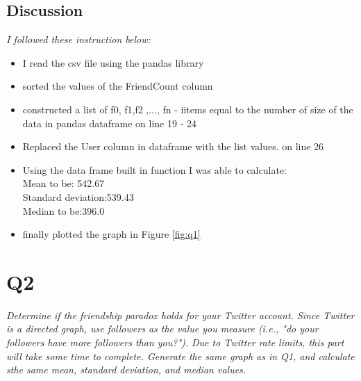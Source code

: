 \documentclass[12pt]{article}
\begin{document}
\subsection*{Discussion}
\emph{I followed these instruction below:}
    \begin{itemize}
        \item I read the csv file using the pandas library 
        \item sorted the values of the FriendCount column
        \item constructed a list of f0, f1,f2 ,..., fn - iitems equal to the number of size of the data in pandas dataframe on line 19 - 24
        \item Replaced the User column in dataframe with the list values. on line 26
        \item Using the data frame built in function I was able to calculate:\\
        Mean to be: 542.67 \\
        Standard deviation:539.43 \\
        Median to be:396.0 
        
        \item finally plotted the graph in Figure \ref{fig:q1}
    \end{itemize}
\section*{Q2}
\emph{
Determine if the friendship paradox holds for your Twitter account. Since Twitter is a directed graph, use followers as the value you measure (i.e., "do your followers have more followers than you?"). Due to Twitter rate limits, this part will take some time to complete.
Generate the same graph as in Q1, and calculate sthe same mean, standard deviation, and median values.}
\end{document}
